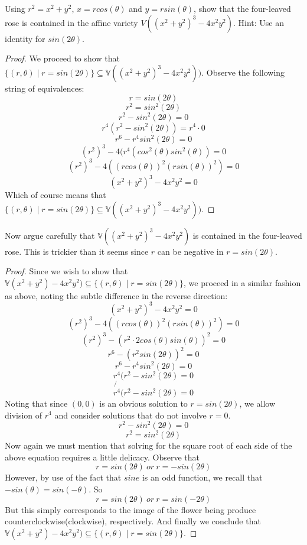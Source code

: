 \documentclass{article}
\newenvironment{problem}[2][Problem]{\begin{trivlist}
\item[\hskip \labelsep {\bfseries #1}\hskip \labelsep {\bfseries #2.}]}{\end{trivlist}}
\begin{document}
\begin{problem}{(7a)}
Using $r^2 = x^2 + y^2$, $x = r cos(\theta)$ and $y = r sin(\theta)$, show that the four-leaved rose is contained in the affine variety $V((x^2 +y^2)^3 -4x^2y^2)$. Hint: Use an identity for $sin(2\theta)$.
\end{problem}
\begin{proof}
We proceed to show that $\{(r,\theta) \mid r = sin(2\theta)\} \subseteq \mathbb{V}((x^2+y^2)^3-4x^2y^2))$. Observe the following string of equivalences: \newline
$$r = sin(2\theta)$$
$$r^2 = sin^2(2\theta)$$ 
$$r^2 - sin^2(2\theta) = 0$$
$$r^4(r^2 - sin^2(2\theta)) = r^4 \cdot 0$$ 
$$r^6 - r^4sin^2(2\theta) = 0$$
$$(r^2)^3 - 4(r^4(cos^2(\theta)sin^2(\theta))=0$$ 
$$(r^2)^3 - 4((rcos(\theta))^2(rsin(\theta))^2)=0$$
$$(x^2 + y^2)^3 - 4x^2y^2 = 0$$
Which of course means that $\{(r,\theta) \mid r = sin(2\theta)\} \subseteq \mathbb{V}((x^2+y^2)^3-4x^2y^2))$.
\end{proof}
\begin{problem}{(7b)}
Now argue carefully that $\mathbb{V}((x^2 + y^2)^3 - 4x^2y^2)$ is contained in the four-leaved rose.
This is trickier than it seems since $r$ can be negative in $r = sin(2\theta)$.
\end{problem}
\begin{proof}
Since we wish to show that $\mathbb{V}(x^2 + y^2) - 4x^2y^2)\subseteq \{(r,\theta) \mid r = sin(2\theta)\}$, we proceed in a similar fashion as above, noting the subtle difference in the reverse direction: \newline
$$(x^2 + y^2)^3 - 4x^2y^2 = 0$$  
$$(r^2)^3 - 4((rcos(\theta))^2(rsin(\theta))^2)=0$$
$$(r^2)^3 - (r^2\cdot2cos(\theta)sin(\theta))^2=0$$
$$r^6 - (r^2sin(2\theta))^2 = 0$$
$$r^6 - r^4sin^2(2\theta) = 0$$
$${r^4}(r^2 - sin^2(2\theta) = 0$$
$$\not{r^4}(r^2 - sin^2(2\theta) = 0$$
Noting that since $(0,0)$ is an obvious solution to $r = sin(2\theta)$, we allow division of $r^4$ and consider solutions that do not involve $r = 0$. 
$$r^2 - sin^2(2\theta) = 0$$ 
$$r^2 = sin^2(2\theta)$$
Now again we must mention that solving for the square root of each side of the above equation requires a little delicacy. Observe that
$$r = sin(2\theta) \ or \ r = -sin(2\theta)$$
However, by use of the fact that $sine$ is an odd function, we recall that $-sin(\theta) = sin(-\theta)$. So
$$r = sin(2\theta) \ or \ r = sin(-2\theta)$$
But this simply corresponds to the image of the flower being produce counterclockwise(clockwise), respectively. And finally we conclude that $\mathbb{V}(x^2 + y^2) - 4x^2y^2)\subseteq \{(r,\theta) \mid r = sin(2\theta)\}$.
\end{proof}
\end{document}
